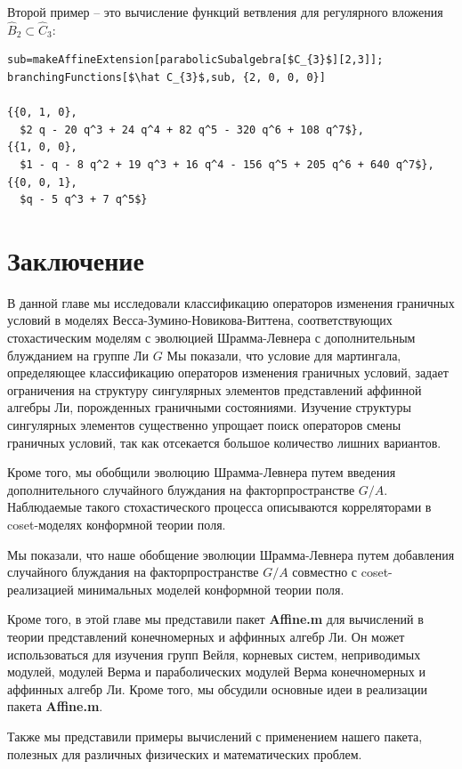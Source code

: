 Второй пример -- это вычисление функций ветвления для регулярного вложения  $\hat B_{2}\subset \hat C_{3}$:
\begin{lstlisting}[mathescape=true]
sub=makeAffineExtension[parabolicSubalgebra[$C_{3}$][2,3]];
branchingFunctions[$\hat C_{3}$,sub, {2, 0, 0, 0}]

{{0, 1, 0}, 
  $2 q - 20 q^3 + 24 q^4 + 82 q^5 - 320 q^6 + 108 q^7$}, 
{{1, 0, 0}, 
  $1 - q - 8 q^2 + 19 q^3 + 16 q^4 - 156 q^5 + 205 q^6 + 640 q^7$}, 
{{0, 0, 1}, 
  $q - 5 q^3 + 7 q^5$}
\end{lstlisting}

\section{Заключение}
\label{sec:6-conclusion}
В данной главе мы исследовали классификацию операторов изменения граничных условий в моделях Весса-Зумино-Новикова-Виттена, соответствующих стохастическим моделям с эволюцией Шрамма-Левнера с дополнительным блужданием на группе Ли $G$ Мы показали, что условие для мартингала, определяющее классификацию операторов изменения граничных условий, задает ограничения на структуру сингулярных элементов представлений аффинной алгебры Ли, порожденных граничными состояниями. Изучение структуры сингулярных элементов существенно упрощает поиск операторов смены граничных условий, так как отсекается большое количество лишних вариантов.

Кроме того, мы обобщили эволюцию Шрамма-Левнера путем введения дополнительного случайного блуждания на факторпространстве $G/A$. Наблюдаемые такого стохастического процесса описываются корреляторами в coset-моделях конформной теории поля. 

Мы показали, что наше обобщение эволюции Шрамма-Левнера путем добавления случайного блуждания на факторпространстве $G/A$ совместно с coset-реализацией минимальных моделей конформной теории поля. 

Кроме того, в этой главе мы представили пакет {\bf Affine.m} для вычислений в теории представлений конечномерных и аффинных алгебр Ли. Он может использоваться для изучения групп Вейля, корневых систем, неприводимых модулей, модулей Верма и параболических модулей Верма конечномерных и аффинных алгебр Ли. Кроме того, мы обсудили основные идеи в реализации пакета  {\bf Affine.m}. 

Также мы представили примеры вычислений с применением нашего пакета, полезных для различных физических и математических проблем. 

